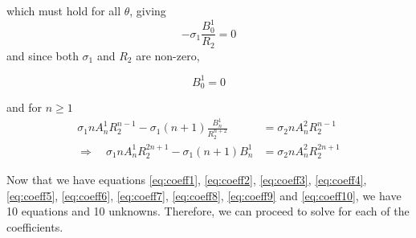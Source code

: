 which must hold for all $\theta$, giving
    \begin{displaymath}
        -\sigma_1 \frac{B_0^1}{R_2} = 0
    \end{displaymath}
and since both $\sigma_1$ and $R_2$ are non-zero,
    \begin{mdframed}[backgroundcolor=gray!10, innertopmargin=0pt, innerbottommargin=10pt]
    \begin{equation}
        B_0^1 = 0
        \label{eq:coeff9}
    \end{equation}
    \end{mdframed}
and for $n \geq 1$
    \begin{equation}
    \begin{split}
        \sigma_1 n A_n^1 R_2^{n-1}
        - \sigma_1 (n+1)\frac{B_n^1}{R_2^{n+2}}
        &=
        \sigma_2 n A_n^2 R_2^{n-1} \\
        \Rightarrow \quad
        \sigma_1 n A_n^1 R_2^{2n+1}
        - \sigma_1 (n+1)B_n^1
        &=
        \sigma_2 n A_n^2 R_2^{2n+1}
        \end{split}
        \label{eq:coeff10}
    \end{equation}

Now that we have equations \ref{eq:coeff1}, \ref{eq:coeff2}, \ref{eq:coeff3}, \ref{eq:coeff4}, \ref{eq:coeff5}, \ref{eq:coeff6}, \ref{eq:coeff7}, \ref{eq:coeff8}, \ref{eq:coeff9} and \ref{eq:coeff10}, we have 10 equations and 10 unknowns. Therefore, we can proceed to solve for each of the coefficients.

